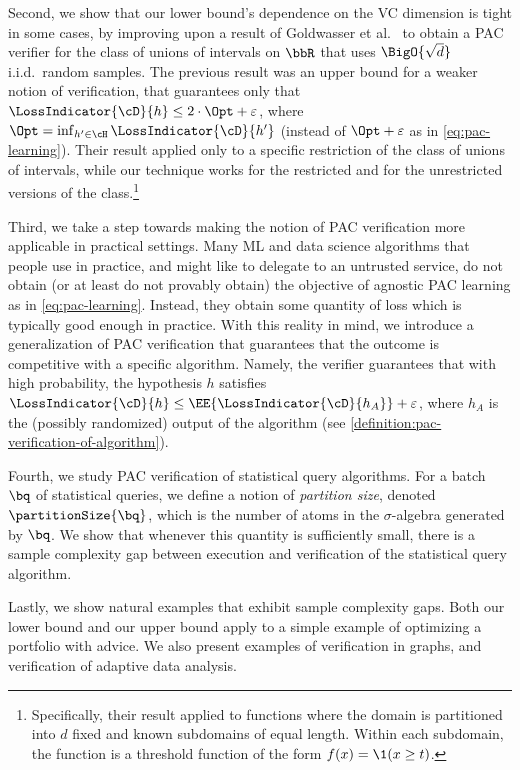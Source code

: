 \documentclass{toc}
\begin{document}
Second, we show that our lower bound's dependence on the VC dimension is tight in some cases, by improving upon a result of Goldwasser et al.\ \cite{GoldwasserRSY21} to obtain a PAC verifier for the class of unions of intervals on $\bbR$ that uses $\BigO{\sqrt{d}}$ i.i.d.\ random samples. The previous result was an upper bound for a weaker notion of verification, that guarantees only that $\LossIndicator{\cD}{h} \leq 2\cdot \Opt + \varepsilon$, where $\Opt = \inf_{h' \in \cH} \LossIndicator{\cD}{h'}$ (instead of $\Opt + \varepsilon$ as in \cref{eq:pac-learning}). Their result applied only to a specific restriction of the class of unions of intervals, while our technique works for the restricted and for the unrestricted versions of the class.\footnote{%
	Specifically, their result applied to functions where the domain is partitioned into $d$ fixed and known subdomains of equal length. Within each subdomain, the function is a threshold function of the form $f(x) = \1(x \geq t)$.%
}

Third, we take a step towards making the notion of PAC verification more applicable in practical settings. Many ML and data science algorithms that people use in practice, and might like to delegate to an untrusted service, do not obtain (or at least do not provably obtain) the objective of agnostic PAC learning as in \cref{eq:pac-learning}. Instead, they obtain some quantity of loss which is typically good enough in practice. With this reality in mind, we introduce a generalization of PAC verification that guarantees that the outcome is competitive with a specific algorithm. Namely, the verifier guarantees that with high probability, the hypothesis $h$ satisfies $\LossIndicator{\cD}{h} \leq \EE{\LossIndicator{\cD}{h_A}} + \varepsilon$, where $h_A$ is the (possibly randomized) output of the algorithm (see \cref{definition:pac-verification-of-algorithm}).

Fourth, we study PAC verification of statistical query algorithms. For a batch $\bq$ of statistical queries, we define a notion of \emph{partition size}, denoted $\partitionSize{\bq}$, which is the number of atoms in the $\sigma$-algebra generated by $\bq$. We show that whenever this quantity is sufficiently small, there is a sample complexity gap between execution and verification of the statistical query algorithm. 

Lastly, we show natural examples that exhibit sample complexity gaps. Both our lower bound and our upper bound apply to a simple example of optimizing a portfolio with advice. We also present examples of verification in graphs, and verification of adaptive data analysis. 
\end{document}
